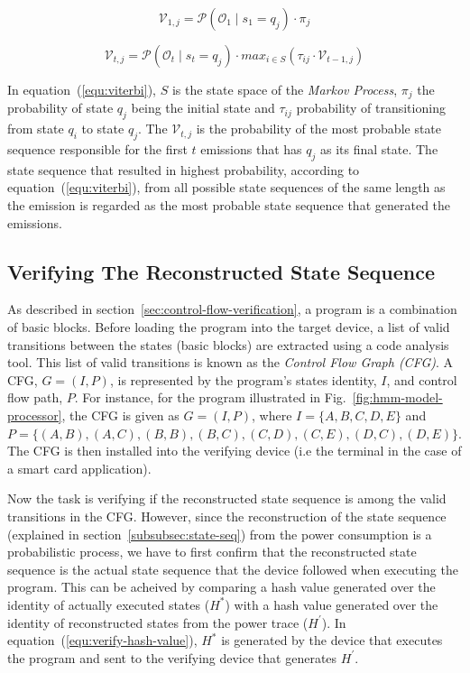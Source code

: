 \documentclass[lnicst]{svmultln}
\begin{document}
\begin{equation}
\mathcal{V}_{1,j} = \mathcal{P}(\mathcal{O}_{1}\mid s_{1}=q_{j}) \cdot \pi_{j}
\label{equ:viterbi-init}
\end{equation}

\begin{equation}
\mathcal{V}_{t,j} = \mathcal{P}(\mathcal{O}_{t}\mid s_{t}=q_{j}) \cdot max_{i \in S} (\tau_{ij} \cdot \mathcal{V}_{t-1,j})
\label{equ:viterbi}
\end{equation}

In equation~(\ref{equ:viterbi}), $S$ is the state space of the \emph{Markov Process}, $\pi_{j}$ the probability of state $q_{j}$ being the initial state and $\tau_{ij}$ probability of transitioning from state $q_{i}$ to state $q_{j}$. The $\mathcal{V}_{t,j}$ is the probability of the most probable state sequence responsible for the first $t$ emissions that has $q_{j}$ as its final state. The state sequence that resulted in highest probability, according to equation~(\ref{equ:viterbi}), from all possible state sequences of the same length as the emission is regarded as the most probable state sequence that generated the emissions.

\subsection{Verifying The Reconstructed State Sequence}
\label{subsec:verification}

As described in section~\ref{sec:control-flow-verification}, a program is a combination of basic blocks. Before loading the program into the target device, a list of valid transitions between the states (basic blocks) are extracted using a code analysis tool. This list of valid transitions is known as the \emph{Control Flow Graph (CFG)}. A CFG, $G=(I,P)$, is represented by the program's states identity, $I$, and control flow path, $P$. For instance, for the program illustrated in Fig.~\ref{fig:hmm-model-processor}, the CFG is given as $G=(I,P)$, where $I=\{ A,B,C,D,E \}$ and $P=\{ (A,B),(A,C),(B,B),(B,C),(C,D),(C,E),(D,C),(D,E) \}$. The CFG is then installed into the verifying device (i.e the terminal in the case of a smart card application).

Now the task is verifying if the reconstructed state sequence is among the valid transitions in the CFG. However, since the reconstruction of the state sequence (explained in section~\ref{subsubsec:state-seq}) from the power consumption is a probabilistic process, we have to first confirm that the reconstructed state sequence is the actual state sequence that the device followed when executing the program. This can be acheived by comparing a hash value generated over the identity of actually executed states ($H^{*}$) with a hash value generated over the identity of reconstructed states from the power trace ($H^{'}$). In equation~(\ref{equ:verify-hash-value}), $H^{*}$ is generated by the device that executes the program and sent to the verifying device that generates $H^{'}$.
\end{document}
